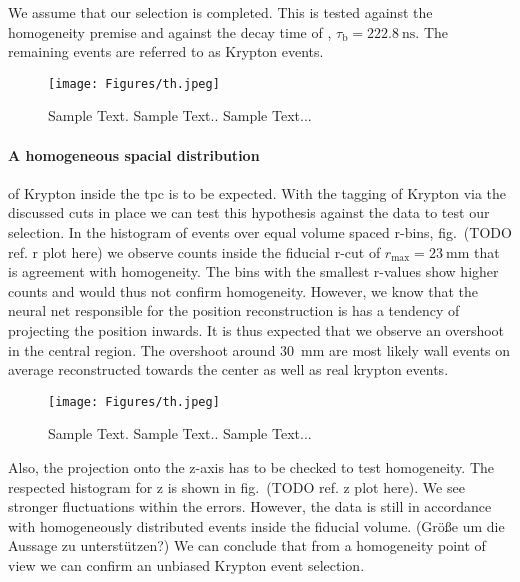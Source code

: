We assume that our selection is completed.
This is tested against the homogeneity premise and against the decay time of , $\tau_\mathrm{b} = \SI{222.8}{\nano\s}$.
The remaining events are referred to as Krypton events.


\begin{figure}
\centering
\texttt{[image: Figures/th.jpeg]}  %
\caption[Area-Width Histogram of main S1 after Fid. Cut]{
        Sample Text.
        Sample Text..
        Sample Text...
    }
\label{fig:main_s1_area_width}
\end{figure}


\paragraph{A homogeneous spacial distribution} of Krypton inside the \gls{tpc} is to be expected.
With the tagging of Krypton via the discussed cuts in place we can test this hypothesis against the data to test our selection.
In the histogram of events over equal volume spaced r-bins, fig.~(TODO ref. r plot here) we observe counts inside the fiducial r-cut of $r_\mathrm{max} = \SI{23}{\milli\m}$ that is agreement with homogeneity.
The bins with the smallest r-values show higher counts and would thus not confirm homogeneity.
However, we know that the neural net responsible for the position reconstruction is has a tendency of projecting the position inwards. %
It is thus expected that we observe an overshoot in the central region.
The overshoot around \SI{30}{\milli\m} are most likely wall events on average reconstructed towards the center as well as real krypton events.

\begin{figure}
\centering
\texttt{[image: Figures/th.jpeg]}  %
\caption[Kr r-histogram Homogeneity]{
        Sample Text.
        Sample Text..
        Sample Text...
    }
\label{fig:r-hist-homogen}
\end{figure}

Also, the projection onto the z-axis has to be checked to test homogeneity.
The respected histogram for z is shown in fig.~(TODO ref. z plot here).
We see stronger fluctuations within the errors.
However, the data is still in accordance with homogeneously distributed events inside the fiducial volume.
(Größe um die Aussage zu unterstützen?)
We can conclude that from a homogeneity point of view we can confirm an unbiased Krypton event selection.

